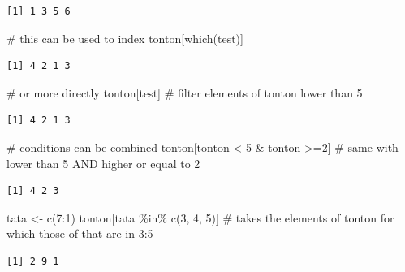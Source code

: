 \documentclass[
  letterpaper,
  DIV=11,
  numbers=noendperiod]{scrreprt}
\newenvironment{Shaded}{\begin{snugshade}}{\end{snugshade}}
\newcommand{\CommentTok}[1]{\textcolor[rgb]{0.37,0.37,0.37}{#1}}
\newcommand{\DecValTok}[1]{\textcolor[rgb]{0.68,0.00,0.00}{#1}}
\newcommand{\FunctionTok}[1]{\textcolor[rgb]{0.28,0.35,0.67}{#1}}
\newcommand{\NormalTok}[1]{\textcolor[rgb]{0.00,0.23,0.31}{#1}}
\newcommand{\OtherTok}[1]{\textcolor[rgb]{0.00,0.23,0.31}{#1}}
\newcommand{\SpecialCharTok}[1]{\textcolor[rgb]{0.37,0.37,0.37}{#1}}
\begin{document}
\begin{verbatim}
[1] 1 3 5 6
\end{verbatim}

\begin{Shaded}
\begin{Highlighting}[]
\CommentTok{\# this can be used to index}
\NormalTok{tonton[}\FunctionTok{which}\NormalTok{(test)]}
\end{Highlighting}
\end{Shaded}

\begin{verbatim}
[1] 4 2 1 3
\end{verbatim}

\begin{Shaded}
\begin{Highlighting}[]
\CommentTok{\# or more directly}
\NormalTok{tonton[test] }\CommentTok{\# filter elements of tonton lower than 5}
\end{Highlighting}
\end{Shaded}

\begin{verbatim}
[1] 4 2 1 3
\end{verbatim}

\begin{Shaded}
\begin{Highlighting}[]
\CommentTok{\# conditions can be combined}
\NormalTok{tonton[tonton }\SpecialCharTok{\textless{}} \DecValTok{5} \SpecialCharTok{\&}\NormalTok{ tonton }\SpecialCharTok{\textgreater{}=}\DecValTok{2}\NormalTok{] }\CommentTok{\# same with lower than 5 AND higher or equal to 2}
\end{Highlighting}
\end{Shaded}

\begin{verbatim}
[1] 4 2 3
\end{verbatim}

\begin{Shaded}
\begin{Highlighting}[]
\NormalTok{tata }\OtherTok{\textless{}{-}} \FunctionTok{c}\NormalTok{(}\DecValTok{7}\SpecialCharTok{:}\DecValTok{1}\NormalTok{)}
\NormalTok{tonton[tata }\SpecialCharTok{\%in\%} \FunctionTok{c}\NormalTok{(}\DecValTok{3}\NormalTok{, }\DecValTok{4}\NormalTok{, }\DecValTok{5}\NormalTok{)] }\CommentTok{\# takes the elements of tonton for which those of that are in 3:5}
\end{Highlighting}
\end{Shaded}

\begin{verbatim}
[1] 2 9 1
\end{verbatim}
\end{document}
